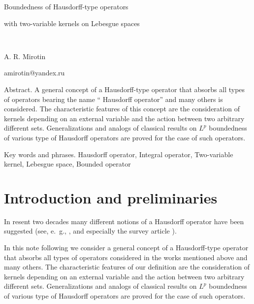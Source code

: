 \documentclass[12pt,reqno]{amsart}
\begin{document}




 
\centerline {\Large Boundedness of  Hausdorff-type operators}
\centerline {\Large with  two-variable kernels on Lebesgue spaces}\label{ch:6} 


\


\centerline { A. R. Mirotin}

\centerline {amirotin@yandex.ru}




\bigskip


Abstract.  A general  concept of a Hausdorff-type operator that absorbs  all types of operators bearing the name `` Hausdorff operator'' and many others is considered. The characteristic features of this  concept are the consideration of kernels depending on an external variable and the action between two arbitrary different sets.
  Generalizations and analogs of  classical results on $L^p$ boundedness  of various type of Hausdorff operators  are proved for the case of such operators.
\bigskip

Key words and phrases.  Hausdorff operator, Integral operator, Two-variable kernel,  Lebesgue space, Bounded operator


\bigskip

\section{Introduction and preliminaries}\label{sec:intr_two}


In resent two  decades many different notions of a Hausdorff operator have been suggested (see, e.~g., \cite{BM1, BM2, CGS,  CFW, DK-2024,  DZDW, GS, KM,  KM2, KSZhu, LL, emj, JMAA,  Lie, MCAOT, MCAOT2, S,  SG}, and especially the survey article \cite{LM:survey}).


In this note following \cite{Mir_Lobach} we consider  a general  concept of a Hausdorff-type operator  that absorbs  all types of operators considered in the works mentioned above and many others.  The characteristic features of our definition are the consideration of kernels depending on an external variable and the action between two arbitrary different sets.
  Generalizations and analogs of  classical results on $L^p$ boundedness  of various type of Hausdorff operators  are proved for the case of such operators.
  
\end{document}
